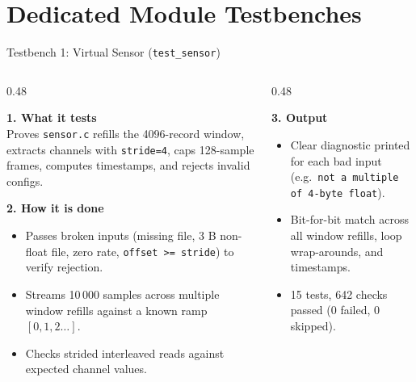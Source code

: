 \section{Dedicated Module Testbenches}

\begin{frame}{Testbench 1: Virtual Sensor (\texttt{test\_sensor})}
  \begin{columns}[t, onlytextwidth]
    \begin{column}{0.48\textwidth}
      \smalltext\compactitem
      \begin{highlight}
        \textbf{1. What it tests} \\
        Proves \texttt{sensor.c} refills the 4096-record window, extracts channels with \texttt{stride=4}, caps 128-sample frames, computes timestamps, and rejects invalid configs.
      \end{highlight}
      \vskip0.5mm
      \begin{tech}
        \textbf{2. How it is done}
        \begin{itemize}
          \item Passes broken inputs (missing file, 3 B non-float file, zero rate, \texttt{offset >= stride}) to verify rejection.
          \item Streams 10\,000 samples across multiple window refills against a known ramp $[0, 1, 2 \dots]$.
          \item Checks strided interleaved reads against expected channel values.
        \end{itemize}
      \end{tech}
    \end{column}
    \begin{column}{0.48\textwidth}
      \smalltext\compactitem
      \begin{tech}
        \textbf{3. Output}
        \begin{itemize}
          \item Clear diagnostic printed for each bad input (e.g.\ \texttt{not a multiple of 4-byte float}).
          \item Bit-for-bit match across all window refills, loop wrap-arounds, and timestamps.
          \item \num{15 tests, 642 checks passed (0 failed, 0 skipped)}.
        \end{itemize}
      \end{tech}
      \vskip1mm
    \end{column}
  \end{columns}
\end{frame}

